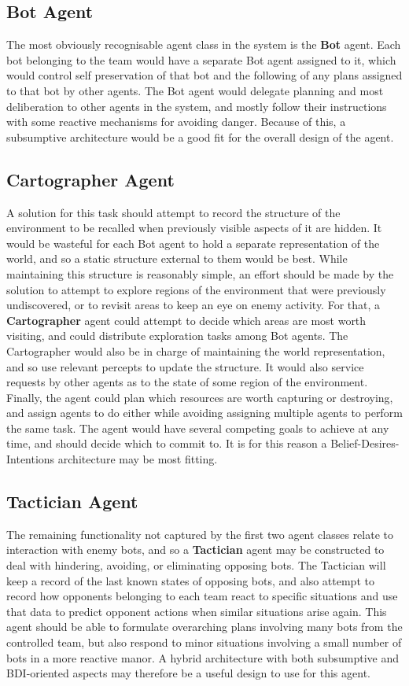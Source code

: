 \documentclass[a4paper,10pt]{article}
\begin{document}
\subsection{Bot Agent}
The most obviously recognisable agent class in the system is the \textbf{Bot} agent. Each bot belonging to the team would have a separate Bot agent assigned to it, which would control self preservation of that bot and the following of any plans assigned to that bot by other agents. The Bot agent would delegate planning and most deliberation to other agents in the system, and mostly follow their instructions with some reactive mechanisms for avoiding danger. Because of this, a subsumptive architecture\cite{brooks90} would be a good fit for the overall design of the agent.

\subsection{Cartographer Agent}
A solution for this task should attempt to record the structure of the environment to be recalled when previously visible aspects of it are hidden. It would be wasteful for each Bot agent to hold a separate representation of the world, and so a static structure external to them would be best. While maintaining this structure is reasonably simple, an effort should be made by the solution to attempt to explore regions of the environment that were previously undiscovered, or to revisit areas to keep an eye on enemy activity. For that, a \textbf{Cartographer} agent could attempt to decide which areas are most worth visiting, and could distribute exploration tasks among Bot agents. The Cartographer would also be in charge of maintaining the world representation, and so use relevant percepts to update the structure. It would also service requests by other agents as to the state of some region of the environment. Finally, the agent could plan which resources are worth capturing or destroying, and assign agents to do either while avoiding assigning multiple agents to perform the same task. The agent would have several competing goals to achieve at any time, and should decide which to commit to. It is for this reason a Belief-Desires-Intentions\cite{rao95} architecture may be most fitting.

\subsection{Tactician Agent}
The remaining functionality not captured by the first two agent classes relate to interaction with enemy bots, and so a \textbf{Tactician} agent may be constructed to deal with hindering, avoiding, or eliminating opposing bots. The Tactician will keep a record of the last known states of opposing bots, and also attempt to record how opponents belonging to each team react to specific situations and use that data to predict opponent actions when similar situations arise again. This agent should be able to formulate overarching plans involving many bots from the controlled team, but also respond to minor situations involving a small number of bots in a more reactive manor. A hybrid architecture with both subsumptive and BDI-oriented aspects may therefore be a useful design to use for this agent.
\end{document}
